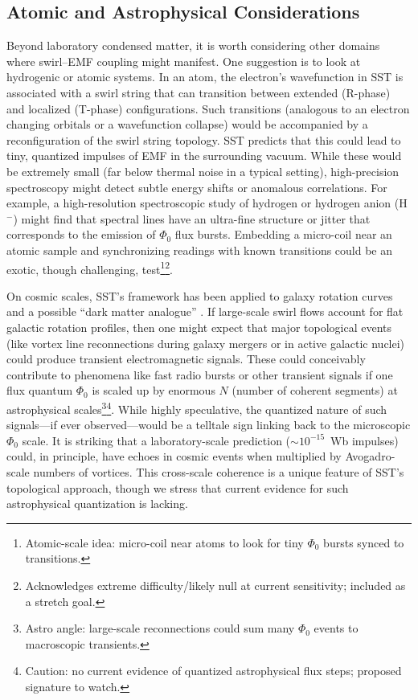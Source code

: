 \documentclass[12pt]{article}
\begin{document}
\subsection{Atomic and Astrophysical Considerations}

Beyond laboratory condensed matter, it is worth considering other domains where swirl–EMF coupling might manifest. One suggestion is to look at hydrogenic or atomic systems. In an atom, the electron’s wavefunction in SST is associated with a swirl string that can transition between extended (R-phase) and localized (T-phase) configurations. Such transitions (analogous to an electron changing orbitals or a wavefunction collapse) would be accompanied by a reconfiguration of the swirl string topology. SST predicts that this could lead to tiny, quantized impulses of EMF in the surrounding vacuum. While these would be extremely small (far below thermal noise in a typical setting), high-precision spectroscopy might detect subtle energy shifts or anomalous correlations. For example, a high-resolution spectroscopic study of hydrogen or hydrogen anion (H$^{-}$) might find that spectral lines have an ultra-fine structure or jitter that corresponds to the emission of $\Phi_{0}$ flux bursts. Embedding a micro-coil near an atomic sample and synchronizing readings with known transitions could be an exotic, though challenging, test\footnote{Atomic-scale idea: micro-coil near atoms to look for tiny $\Phi_0$ bursts synced to transitions.}\footnote{Acknowledges extreme difficulty/likely null at current sensitivity; included as a stretch goal.}.


On cosmic scales, SST’s framework has been applied to galaxy rotation curves and a possible ``dark matter analogue'' \cite{Iskandarani2025RotatingFrame}. If large-scale swirl flows account for flat galactic rotation profiles, then one might expect that major topological events (like vortex line reconnections during galaxy mergers or in active galactic nuclei) could produce transient electromagnetic signals. These could conceivably contribute to phenomena like fast radio bursts or other transient signals if one flux quantum $\Phi_{0}$ is scaled up by enormous $N$ (number of coherent segments) at astrophysical scales\footnote{Astro angle: large-scale reconnections could sum many $\Phi_0$ events to macroscopic transients.}\footnote{Caution: no current evidence of quantized astrophysical flux steps; proposed signature to watch.}. While highly speculative, the quantized nature of such signals—if ever observed—would be a telltale sign linking back to the microscopic $\Phi_{0}$ scale. It is striking that a laboratory-scale prediction ($\sim10^{-15}$~Wb impulses) could, in principle, have echoes in cosmic events when multiplied by Avogadro-scale numbers of vortices. This cross-scale coherence is a unique feature of SST’s topological approach, though we stress that current evidence for such astrophysical quantization is lacking.
\end{document}
